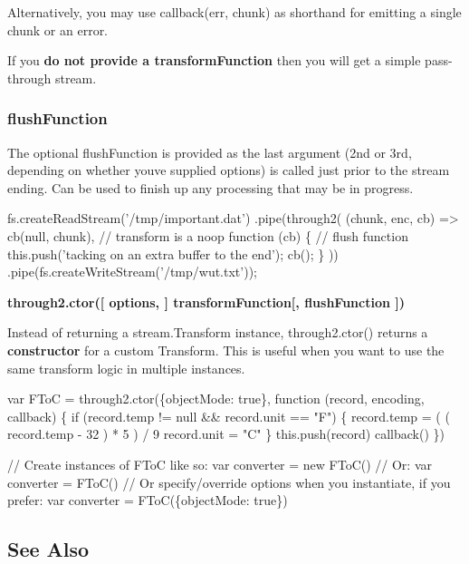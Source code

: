 Alternatively, you may use {\ttfamily callback(err, chunk)} as shorthand for emitting a single chunk or an error.

If you {\bfseries do not provide a {\ttfamily transform\+Function}} then you will get a simple pass-\/through stream.

\subsubsection*{flush\+Function}

The optional {\ttfamily flush\+Function} is provided as the last argument (2nd or 3rd, depending on whether you\textquotesingle{}ve supplied options) is called just prior to the stream ending. Can be used to finish up any processing that may be in progress.


\begin{DoxyCode}
fs.createReadStream('/tmp/important.dat')
  .pipe(through2(
    (chunk, enc, cb) => cb(null, chunk), // transform is a noop
    function (cb) \{ // flush function
      this.push('tacking on an extra buffer to the end');
      cb();
    \}
  ))
  .pipe(fs.createWriteStream('/tmp/wut.txt'));
\end{DoxyCode}


{\bfseries {\ttfamily through2.\+ctor(\mbox{[} options, \mbox{]} transform\+Function\mbox{[}, flush\+Function \mbox{]})}}

Instead of returning a {\ttfamily stream.\+Transform} instance, {\ttfamily through2.\+ctor()} returns a {\bfseries constructor} for a custom Transform. This is useful when you want to use the same transform logic in multiple instances.


\begin{DoxyCode}
var FToC = through2.ctor(\{objectMode: true\}, function (record, encoding, callback) \{
  if (record.temp != null && record.unit == "F") \{
    record.temp = ( ( record.temp - 32 ) * 5 ) / 9
    record.unit = "C"
  \}
  this.push(record)
  callback()
\})

// Create instances of FToC like so:
var converter = new FToC()
// Or:
var converter = FToC()
// Or specify/override options when you instantiate, if you prefer:
var converter = FToC(\{objectMode: true\})
\end{DoxyCode}


\subsection*{See Also}


